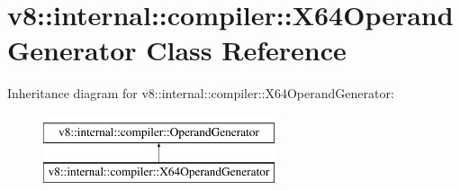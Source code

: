 \hypertarget{classv8_1_1internal_1_1compiler_1_1X64OperandGenerator}{}\section{v8\+:\+:internal\+:\+:compiler\+:\+:X64\+Operand\+Generator Class Reference}
\label{classv8_1_1internal_1_1compiler_1_1X64OperandGenerator}
Inheritance diagram for v8\+:\+:internal\+:\+:compiler\+:\+:X64\+Operand\+Generator\+:\begin{figure}[H]
\begin{center}
\leavevmode
\includegraphics[height=2.000000cm]{classv8_1_1internal_1_1compiler_1_1X64OperandGenerator}
\end{center}
\end{figure}
